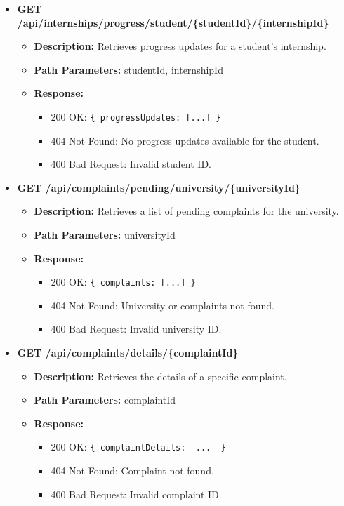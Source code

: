 \begin{itemize}
    \item \textbf{GET /api/internships/progress/student/\{studentId\}/\{internshipId\}}  
    \begin{itemize}
        \item \textbf{Description:} Retrieves progress updates for a student's internship.
        \item \textbf{Path Parameters:} studentId, internshipId
        \item \textbf{Response:}
        \begin{itemize}
            \item 200 OK: \texttt{\{ progressUpdates: [...] \}}
            \item 404 Not Found: No progress updates available for the student.
            \item 400 Bad Request: Invalid student ID.
        \end{itemize}
    \end{itemize}
    
    \item \textbf{GET /api/complaints/pending/university/\{universityId\}}  
    \begin{itemize}
        \item \textbf{Description:} Retrieves a list of pending complaints for the university.
        \item \textbf{Path Parameters:} universityId  
        \item \textbf{Response:}
        \begin{itemize}
            \item 200 OK: \texttt{\{ complaints: [...] \}}
            \item 404 Not Found: University or complaints not found.
            \item 400 Bad Request: Invalid university ID.
        \end{itemize}
    \end{itemize}

    \item \textbf{GET /api/complaints/details/\{complaintId\}}  
    \begin{itemize}
        \item \textbf{Description:} Retrieves the details of a specific complaint.
        \item \textbf{Path Parameters:} complaintId  
        \item \textbf{Response:}
        \begin{itemize}
            \item 200 OK: \texttt{\{ complaintDetails: { ... } \}}
            \item 404 Not Found: Complaint not found.
            \item 400 Bad Request: Invalid complaint ID.
        \end{itemize}
    \end{itemize}


\end{itemize}
